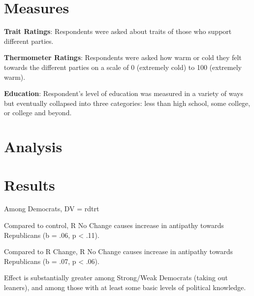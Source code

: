 \documentclass[12pt]{article}
\begin{document}
\section*{Measures}

\textbf{Trait Ratings}: Respondents were asked about traits of those who
support different parties.

\textbf{Thermometer Ratings}: Respondents were asked how warm or cold they felt
towards the different parties on a scale of 0 (extremely cold) to 100 (extremely
warm).

\textbf{Education}: Respondent's level of education was measured in a variety
of ways but eventually collapsed into three categories: less than high
school, some college, or college and beyond.

\section*{Analysis}

\section*{Results}

Among Democrats, DV = rdtrt

Compared to control, R No Change causes increase in antipathy towards
Republicans (b = .06, p < .11).

Compared to R Change, R No Change causes increase in antipathy towards
Republicans (b = .07, p < .06).

Effect is substantially greater among Strong/Weak Democrats (taking out
leaners), and among those with at least some basic levels of political
knowledge.

\clearpage 
\end{document}
